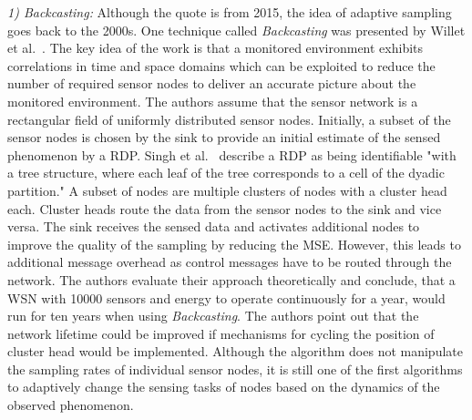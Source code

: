 \par
\textit{1) Backcasting:}
Although the quote is from 2015, the idea of adaptive sampling goes back to the
2000s. One technique called \textit{Backcasting} was presented by Willet et
al.~\cite{willett2004backcasting}. The key idea of the work is that a monitored
environment exhibits correlations in time and space domains which can be
exploited to reduce the number of required sensor nodes to deliver an accurate
picture about the monitored environment. The authors assume that the sensor
network is a rectangular field of uniformly distributed sensor nodes.
Initially, a subset of the sensor nodes is chosen by the sink to provide an
initial estimate of the sensed phenomenon by a \ac{RDP}. Singh et
al.~\cite{singh2006active} describe a \ac{RDP} as being identifiable "with a
tree structure, where each leaf of the tree corresponds to a cell of the dyadic
partition." A subset of nodes are multiple clusters of nodes with a cluster
head each. Cluster heads route the data from the sensor nodes to the sink and
vice versa. The sink receives the sensed data and activates additional nodes to
improve the quality of the sampling by reducing the \ac{MSE}. However, this
leads to additional message overhead as control messages have to be routed
through the network. The authors evaluate their approach theoretically and
conclude, that a \ac{WSN} with 10000 sensors and energy to operate continuously
for a year, would run for ten years when using \textit{Backcasting}. The
authors point out that the network lifetime could be improved if mechanisms for
cycling the position of cluster head would be implemented. Although the
algorithm does not manipulate the sampling rates of individual sensor nodes, it
is still one of the first algorithms to adaptively change the sensing tasks of
nodes based on the dynamics of the observed phenomenon.

\par

